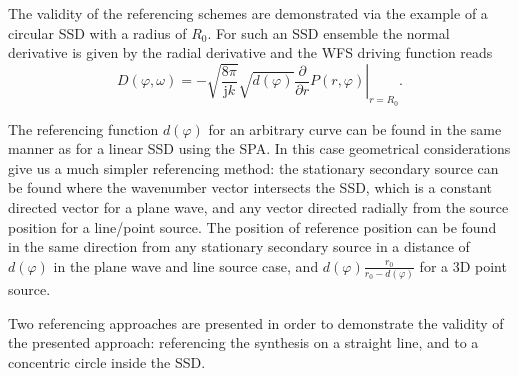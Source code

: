 \documentclass[12pt,a4paper]{article}
\newcommand{\te}{\mathrm{e}}
\newcommand{\ti}{\mathrm{j}}
\newcommand{\sinfi}{\sin\varphi}
\newcommand{\cosfi}{\cos\varphi}
\newcommand{\vxo}{\mathbf{x}_0}
\begin{document}
The validity of the referencing schemes are demonstrated via the example of a circular SSD with a radius of $R_0$. For such an SSD ensemble the normal derivative is given by the radial derivative
and the WFS driving function reads
\begin{equation}
D(\varphi,\omega) = - \sqrt{\frac{8\pi}{\ti k}}\sqrt{d(\varphi)} \left. \frac{\partial}{\partial r} P(r,\varphi) \right|_{r = R_0}.
\end{equation}

\vspace{3mm}
The referencing function $d(\varphi)$ for an arbitrary curve can be found in the same manner as for a linear SSD using the SPA. In this case geometrical considerations give us a much simpler referencing method: the stationary secondary source can be found where the wavenumber vector intersects the SSD, which is a constant directed vector for a plane wave, and any vector directed radially from the source position for a line/point source. The position of reference position can be found in the same direction from any stationary secondary source in a distance of $d(\varphi)$ in the plane wave and line source case, and $d(\varphi)\frac{r_0}{r_0-d(\varphi)}$ for a 3D point source.

%
Two referencing approaches are presented in order to demonstrate the validity of the presented approach: referencing the synthesis on a straight line, and to a concentric circle inside the SSD. %
\end{document}
